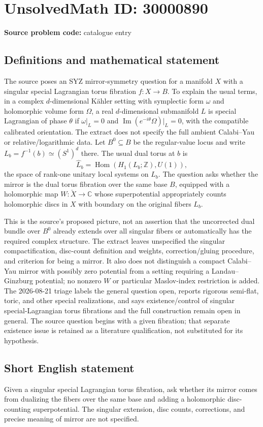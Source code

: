 \documentclass[11pt]{article}
\newcommand{\Z}{\mathbb{Z}}
\newcommand{\C}{\mathbb{C}}
\begin{document}
\section*{UnsolvedMath ID: 30000890}
\textbf{Source problem code:} catalogue entry
\subsection{Definitions and mathematical statement}
The source poses an SYZ mirror-symmetry question for a manifold $X$ with a singular special Lagrangian torus fibration $f:X\to B$. To explain the usual terms, in a complex $d$-dimensional K\"ahler setting with symplectic form $\omega$ and holomorphic volume form $\Omega$, a real $d$-dimensional submanifold $L$ is special Lagrangian of phase $\theta$ if $\omega|_L=0$ and $\operatorname{Im}(e^{-i\theta}\Omega)|_L=0$, with the compatible calibrated orientation. The extract does not specify the full ambient Calabi--Yau or relative/logarithmic data. Let $B^0\subseteq B$ be the regular-value locus and write $L_b=f^{-1}(b)\simeq(S^1)^d$ there. The usual dual torus at $b$ is \[\widehat L_b=\operatorname{Hom}(H_1(L_b;\Z),U(1)),\] the space of rank-one unitary local systems on $L_b$. The question asks whether the mirror is the dual torus fibration over the same base $B$, equipped with a holomorphic map $W:\check X\to\C$ whose superpotential appropriately counts holomorphic discs in $X$ with boundary on the original fibers $L_b$.\par This is the source's proposed picture, not an assertion that the uncorrected dual bundle over $B^0$ already extends over all singular fibers or automatically has the required complex structure. The extract leaves unspecified the singular compactification, disc-count definition and weights, correction/gluing procedure, and criterion for being a mirror. It also does not distinguish a compact Calabi--Yau mirror with possibly zero potential from a setting requiring a Landau--Ginzburg potential; no nonzero $W$ or particular Maslov-index restriction is added. The 2026-08-21 triage labels the general question open, reports rigorous semi-flat, toric, and other special realizations, and says existence/control of singular special-Lagrangian torus fibrations and the full construction remain open in general. The source question begins with a given fibration; that separate existence issue is retained as a literature qualification, not substituted for its hypothesis.
\subsection{Short English statement}
Given a singular special Lagrangian torus fibration, ask whether its mirror comes from dualizing the fibers over the same base and adding a holomorphic disc-counting superpotential. The singular extension, disc counts, corrections, and precise meaning of mirror are not specified.
\end{document}
